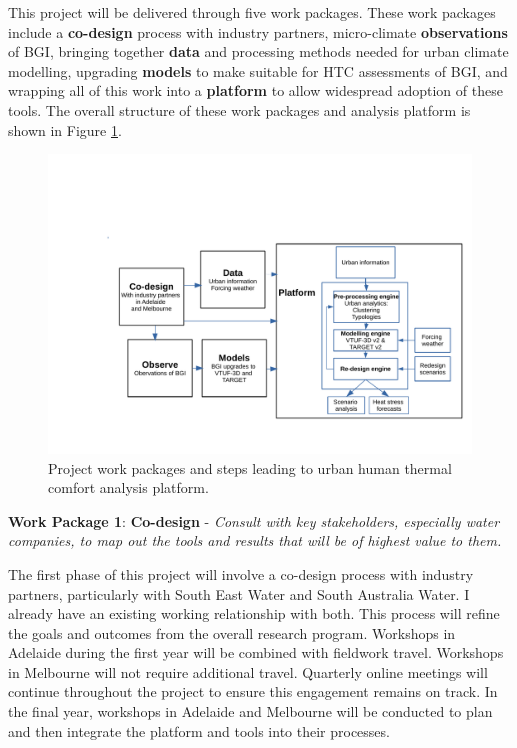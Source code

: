 This project will be delivered through five work packages. These work packages include a \textbf{co-design} process with industry partners, micro-climate \textbf{observations} of BGI, bringing together \textbf{data} and processing methods needed for urban climate modelling, upgrading \textbf{models} to make suitable for HTC assessments of BGI, and wrapping all of this work into a \textbf{platform} to allow widespread adoption of these tools. The overall structure of these work packages and analysis platform is shown in Figure \ref{fig:overall}.

\begin{figure}[ht]
\begin{center}
\includegraphics[scale=0.5,trim=140 70 20 175,clip]{PlatformProcesses4.pdf}
\end{center}
\caption{Project work packages and steps leading to urban human thermal comfort analysis platform.}
\label{fig:overall}
\end{figure}

\textbf{Work Package 1}: \textbf{Co-design} - \emph{Consult with key stakeholders, especially water companies, to map out the tools and results that will be of highest value to them. }

The first phase of this project will involve a co-design process with industry partners, particularly with South East Water and South Australia Water. I already have an existing working relationship with both. This process will refine the goals and outcomes from the overall research program. Workshops in Adelaide during the first year will be combined with fieldwork travel. Workshops in Melbourne will not require additional travel. Quarterly online meetings will continue throughout the project to ensure this engagement remains on track. In the final year, workshops in Adelaide and Melbourne will be conducted to plan and then integrate the platform and tools into their processes.

